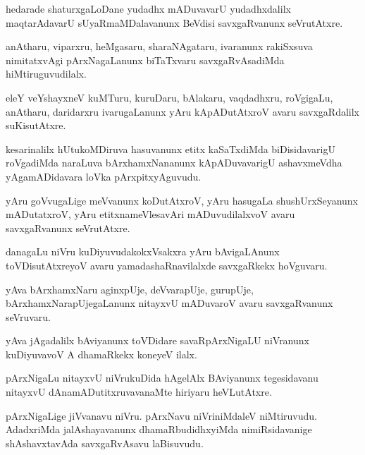 \documentclass{article}
\begin{document}
\begin{mn}
hedarade shaturxgaLoDane yudadhx mADuvavarU yudadhxdalilx maqtarAdavarU sUyaRmaMDalavanunx BeVdisi 
savxgaRvanunx seVrutAtxre.
\end{mn}

\begin{mn}
anAtharu, viparxru, heMgasaru, sharaNAgataru, ivaranunx rakiSxsuva nimitatxvAgi pArxNagaLanunx 
biTaTxvaru savxgaRvAsadiMda hiMtiruguvudilalx.
\end{mn}

\begin{mn}
eleY veYshayxneV kuMTuru, kuruDaru, bAlakaru, vaqdadhxru, roVgigaLu, anAtharu, daridarxru 
ivarugaLanunx yAru kApADutAtxroV avaru savxgaRdalilx suKisutAtxre.
\end{mn}

\begin{mn}
kesarinalilx hUtukoMDiruva hasuvanunx etitx kaSaTxdiMda biDisidavarigU roVgadiMda naraLuva 
bArxhamxNananunx kApADuvavarigU ashavxmeVdha yAgamADidavara loVka pArxpitxyAguvudu.
\end{mn}

\begin{mn}
yAru goVvugaLige meVvanunx koDutAtxroV, yAru hasugaLa shushUrxSeyanunx mADutatxroV, yAru 
etitxnameVlesavAri mADuvudilalxvoV avaru savxgaRvanunx seVrutAtxre.
\end{mn}

\begin{mn}
danagaLu niVru kuDiyuvudakokxVsakxra yAru bAvigaLAnunx toVDisutAtxreyoV avaru 
yamadashaRnavilalxde savxgaRkekx hoVguvaru. 
\end{mn}

\begin{mn}
yAva bArxhamxNaru aginxpUje, deVvarapUje, gurupUje, bArxhamxNarapUjegaLanunx nitayxvU mADuvaroV 
avaru savxgaRvanunx seVruvaru.
\end{mn}

\begin{mn}
yAva jAgadalilx bAviyanunx toVDidare savaRpArxNigaLU niVranunx kuDiyuvavoV A dhamaRkekx koneyeV 
ilalx.
\end{mn}

\begin{mn}
pArxNigaLu nitayxvU niVrukuDida hAgelAlx BAviyanunx tegesidavanu nitayxvU dAnamADutitxruvavanaMte 
hiriyaru heVLutAtxre.
\end{mn}

\begin{mn}
pArxNigaLige jiVvanavu niVru. pArxNavu niVriniMdaleV  niMtiruvudu. AdadxriMda jalAshayavanunx 
dhamaRbudidhxyiMda nimiRsidavanige shAshavxtavAda savxgaRvAsavu laBisuvudu.
\end{mn}
\end{document}

